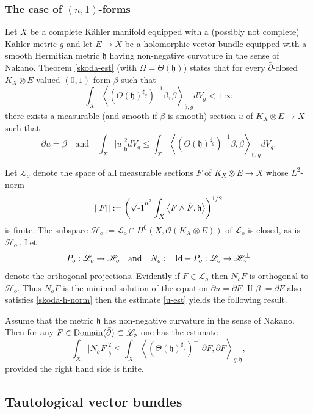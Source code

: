 \documentclass[12pt,hidelinks]{amsart}
\newcommand{\cO}{{\mathcal O}}
\newcommand{\sH}{{\mathscr H}}
\newcommand{\sL}{{\mathscr L}}
\newcommand{\fh}{{\mathfrak h}}
\newcommand{\dbar}{\bar \partial}
\newcommand{\ii}{\sqrt{\text{\rm -}1}}
\newcommand{\tensor}{\otimes}
\begin{document}
\subsubsection*{\sc The case of $(n,1)$-forms}

Let $X$ be a complete K\"ahler manifold equipped with a (possibly not complete) K\"ahler metric $g$ and let  $E \to X$ be a holomorphic vector bundle equipped with a smooth Hermitian metric $\fh$ having non-negative curvature in the sense of Nakano.  Theorem \ref{skoda-est} (with $\Omega = \Theta (\fh)$) states that for every $\dbar$-closed $K_X \tensor E$-valued $(0,1)$-form $\beta$ such that 
\begin{equation}\label{skoda-h-norm}
\int _X\left < \left (\Theta (\fh) ^{\sharp_g}\right )^{-1} \beta , \beta\right >_{\fh,g} dV_g < +\infty
\end{equation}
there exists a measurable (and smooth if $\beta$ is smooth) section $u$ of $K_X \tensor E \to X$ such that 
\begin{equation}\label{u-est}
\dbar u = \beta \quad \text{and} \quad \int _X |u|^2_{\fh} dV_g  \le  \int _X\left < \left (\Theta (\fh) ^{\sharp_g}\right )^{-1} \beta , \beta\right >_{\fh,g} dV_g.
\end{equation}

Let $\sL_o$ denote the space of all measurable sections $F$ of $K_X \tensor E\to X$ whose $L^2$-norm 
\[
||F|| := \left (\ii ^{n^2}  \int_X \left < F \wedge \bar F , \fh\right > \right )^{1/2}
\]
is finite.  The subspace $\sH_o:= \sL_o\cap H^0(X, \cO(K_X \tensor E))$ of $\sL_o$ is closed, as is $\sH _o ^{\perp}$.  Let 
\[\label{bergman-proj}
P_o : \sL _o \to \sH _o \quad \text{and} \quad N_o := {\rm Id}- P_o : \sL_o \to \sH_o^{\perp}
\]
denote the orthogonal projections.  Evidently if $F \in \sL_o$ then $N_oF$ is orthogonal to $\sH_o$.  Thus $N_oF$ is the minimal solution of the equation $\dbar u = \dbar F$.  If $\beta := \dbar F$ also satisfies \eqref{skoda-h-norm} then the estimate \eqref{u-est} yields the following result.

\begin{thm}\label{hormander-estimate}
Assume that the metric $\fh$ has non-negative curvature in the sense of Nakano.  Then for any $F\in {\rm Domain} (\dbar) \subset \sL_o$ one has the estimate 
\[
\int _X |N_oF|^2_{\fh} \le   \int _X\left <\left (\Theta (\fh) ^{\sharp_g}\right )^{-1}\dbar F , \dbar F \right >_{g,\fh} ,
\]
provided the right hand side is finite.
\end{thm}

\subsection{Tautological vector bundles}
\end{document}
